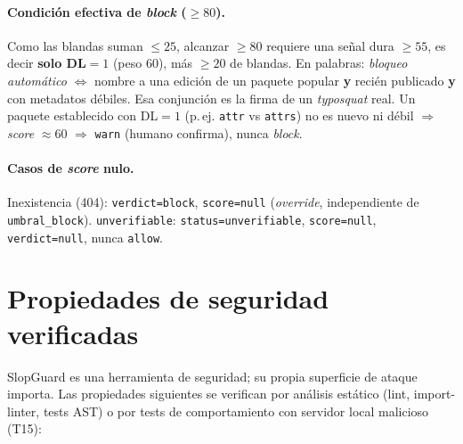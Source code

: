\documentclass[11pt,a4paper]{article}
\begin{document}
\paragraph{Condición efectiva de \emph{block} ($\ge 80$).} Como las blandas suman $\le 25$,
alcanzar $\ge 80$ requiere una señal dura $\ge 55$, es decir \textbf{solo DL$=1$} (peso 60),
más $\ge 20$ de blandas. En palabras: \emph{bloqueo automático} $\iff$ nombre a una edición
de un paquete popular \textbf{y} recién publicado \textbf{y} con metadatos débiles. Esa
conjunción es la firma de un \emph{typosquat} real. Un paquete establecido con DL$=1$ (p.\,ej.
\texttt{attr} vs \texttt{attrs}) no es nuevo ni débil $\Rightarrow$ \emph{score} $\approx 60$
$\Rightarrow$ \texttt{warn} (humano confirma), nunca \emph{block}.

\paragraph{Casos de \emph{score} nulo.} Inexistencia (404): \texttt{verdict=block},
\texttt{score=null} (\emph{override}, independiente de \texttt{umbral_block}).
\texttt{unverifiable}: \texttt{status=unverifiable}, \texttt{score=null},
\texttt{verdict=null}, nunca \texttt{allow}.

\section{Propiedades de seguridad verificadas}

SlopGuard es una herramienta de seguridad; su propia superficie de ataque importa.
Las propiedades siguientes se verifican por análisis estático (lint, import-linter,
tests AST) o por tests de comportamiento con servidor local malicioso (T15):
\end{document}
